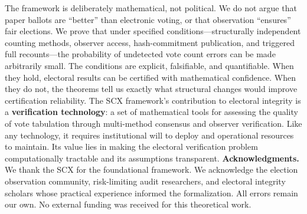 \documentclass[11pt,a4paper]{article}
\theoremstyle{definition}
\newcommand{\SCX}{\textsc{SCX}}
\begin{document}
The framework is deliberately mathematical, not political. We do not argue that paper ballots are ``better'' than electronic voting, or that observation ``ensures'' fair elections. We prove that under specified conditions---structurally independent counting methods, observer access, hash-commitment publication, and triggered full recounts---the probability of undetected vote count errors can be made arbitrarily small. The conditions are explicit, falsifiable, and quantifiable. When they hold, electoral results can be certified with mathematical confidence. When they do not, the theorems tell us exactly what structural changes would improve certification reliability.
The \SCX{} framework's contribution to electoral integrity is a \textbf{verification technology}: a set of mathematical tools for assessing the quality of vote tabulation through multi-method consensus and observer verification. Like any technology, it requires institutional will to deploy and operational resources to maintain. Its value lies in making the electoral verification problem computationally tractable and its assumptions transparent.
\medskip
\noindent\textbf{Acknowledgments.} We thank the SCX for the foundational framework. We acknowledge the election observation community, risk-limiting audit researchers, and electoral integrity scholars whose practical experience informed the formalization. All errors remain our own. No external funding was received for this theoretical work.
\end{document}
